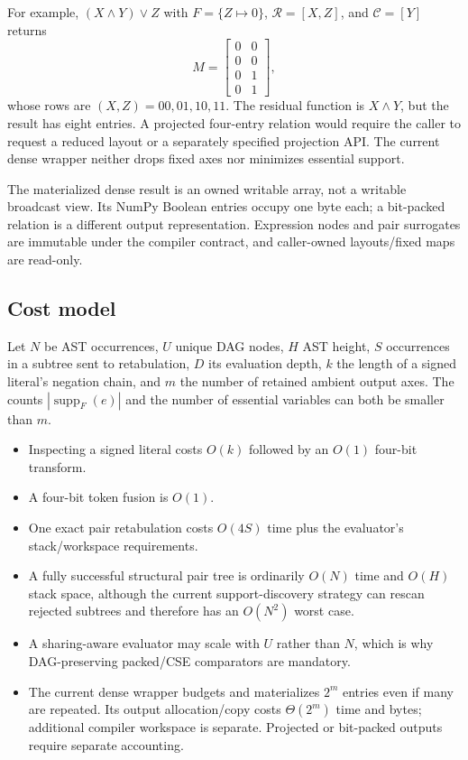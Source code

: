 \documentclass[10pt]{article}
\newcommand{\supp}{\operatorname{supp}}
\theoremstyle{plain}
\theoremstyle{definition}
\theoremstyle{remark}
\begin{document}
For example, $(X\land Y)\lor Z$ with $F=\{Z\mapsto0\}$, $\mathcal R=[X,Z]$, and $\mathcal C=[Y]$ returns
\begin{equation}
 M=\begin{bmatrix}0&0\\0&0\\0&1\\0&1\end{bmatrix},
 \label{eq:fixed-axis-example}
\end{equation}
whose rows are $(X,Z)=00,01,10,11$. The residual function is $X\land Y$, but the result has eight entries. A projected four-entry relation would require the caller to request a reduced layout or a separately specified projection API. The current dense wrapper neither drops fixed axes nor minimizes essential support.

The materialized dense result is an owned writable array, not a writable broadcast view. Its NumPy Boolean entries occupy one byte each; a bit-packed relation is a different output representation. Expression nodes and pair surrogates are immutable under the compiler contract, and caller-owned layouts/fixed maps are read-only.

\subsection{Cost model}

Let $N$ be AST occurrences, $U$ unique DAG nodes, $H$ AST height, $S$ occurrences in a subtree sent to retabulation, $D$ its evaluation depth, $k$ the length of a signed literal's negation chain, and $m$ the number of retained ambient output axes. The counts $|\supp_F(e)|$ and the number of essential variables can both be smaller than $m$.

\begin{itemize}
 \item Inspecting a signed literal costs $O(k)$ followed by an $O(1)$ four-bit transform.
 \item A four-bit token fusion is $O(1)$.
 \item One exact pair retabulation costs $O(4S)$ time plus the evaluator's stack/workspace requirements.
 \item A fully successful structural pair tree is ordinarily $O(N)$ time and $O(H)$ stack space, although the current support-discovery strategy can rescan rejected subtrees and therefore has an $O(N^2)$ worst case.
 \item A sharing-aware evaluator may scale with $U$ rather than $N$, which is why DAG-preserving packed/CSE comparators are mandatory.
 \item The current dense wrapper budgets and materializes $2^m$ entries even if many are repeated. Its output allocation/copy costs $\Theta(2^m)$ time and bytes; additional compiler workspace is separate. Projected or bit-packed outputs require separate accounting.
\end{itemize}
\end{document}
